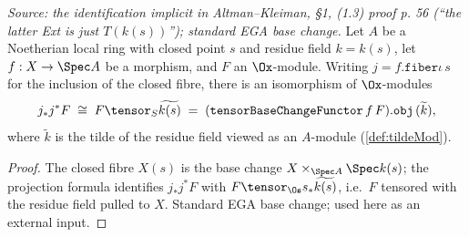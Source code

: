 \begin{theorem}
  \label{thm:ega_fibre_tensor_residue}
  \textit{Source: the identification implicit in Altman--Kleiman, §1, (1.3) proof
  p. 56 (``the latter Ext is just $T(k(s))$''); standard EGA base change.}
  Let $A$ be a Noetherian local ring with closed point $s$ and residue field
  $k = k(s)$, let $f : X \to \Spec A$ be a morphism, and $F$ an $\Ox$-module.
  Writing $j = f.\mathtt{fiber}\iota\,s$ for the inclusion of the closed fibre,
  there is an isomorphism of $\Ox$-modules
  \[
    j_* j^* F \;\cong\; F \tensor_S \widetilde{k(s)}
      \;=\; (\mathtt{tensorBaseChangeFunctor}\,f\,F).\mathtt{obj}\,(\widetilde{k}),
  \]
  where $\widetilde{k}$ is the tilde of the residue field viewed as an
  $A$-module (\cref{def:tildeMod}).
  \begin{proof}
    The closed fibre $X(s)$ is the base change $X \times_{\Spec A} \Spec k(s)$;
    the projection formula identifies $j_* j^* F$ with $F \tensor_{\Os}
    s_*\widetilde{k(s)}$, i.e.\ $F$ tensored with the residue field pulled to $X$.
    Standard EGA base change; used here as an external input.
  \end{proof}
\end{theorem}


